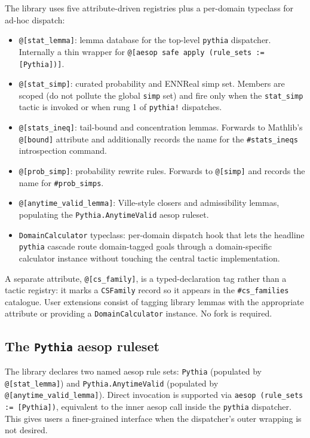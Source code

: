 The library uses five attribute-driven registries plus a
per-domain typeclass for ad-hoc dispatch:

\begin{itemize}[leftmargin=1.3em,itemsep=0.2em]
\item \texttt{@[stat\_lemma]}: lemma database for the top-level
  \texttt{pythia} dispatcher. Internally a thin wrapper for
  \texttt{@[aesop safe apply (rule\_sets := [Pythia])]}.
\item \texttt{@[stat\_simp]}: curated probability and ENNReal simp
  set. Members are scoped (do not pollute the global \texttt{simp}
  set) and fire only when the \texttt{stat\_simp} tactic is invoked
  or when rung 1 of \texttt{pythia!} dispatches.
\item \texttt{@[stats\_ineq]}: tail-bound and concentration lemmas.
  Forwards to Mathlib's \texttt{@[bound]} attribute and additionally
  records the name for the \texttt{\#stats\_ineqs} introspection
  command.
\item \texttt{@[prob\_simp]}: probability rewrite rules. Forwards to
  \texttt{@[simp]} and records the name for \texttt{\#prob\_simps}.
\item \texttt{@[anytime\_valid\_lemma]}: Ville-style closers and
  admissibility lemmas, populating the
  \texttt{Pythia.AnytimeValid} aesop ruleset.
\item \texttt{DomainCalculator} typeclass: per-domain dispatch
  hook that lets the headline \texttt{pythia} cascade route
  domain-tagged goals through a domain-specific calculator
  instance without touching the central tactic implementation.
\end{itemize}

A separate attribute, \texttt{@[cs\_family]}, is a typed-declaration
tag rather than a tactic registry: it marks a \texttt{CSFamily}
record so it appears in the \texttt{\#cs\_families} catalogue.
User extensions consist of tagging library lemmas with the
appropriate attribute or providing a \texttt{DomainCalculator}
instance. No fork is required.

\subsection{The \texttt{Pythia} aesop ruleset}
\label{sec:tactic-surface-aesop}

The library declares two named aesop rule sets: \texttt{Pythia}
(populated by \texttt{@[stat\_lemma]}) and \texttt{Pythia.AnytimeValid}
(populated by \texttt{@[anytime\_valid\_lemma]}). Direct invocation
is supported via \texttt{aesop (rule\_sets := [Pythia])}, equivalent
to the inner aesop call inside the \texttt{pythia} dispatcher. This
gives users a finer-grained interface when the dispatcher's outer
wrapping is not desired.

